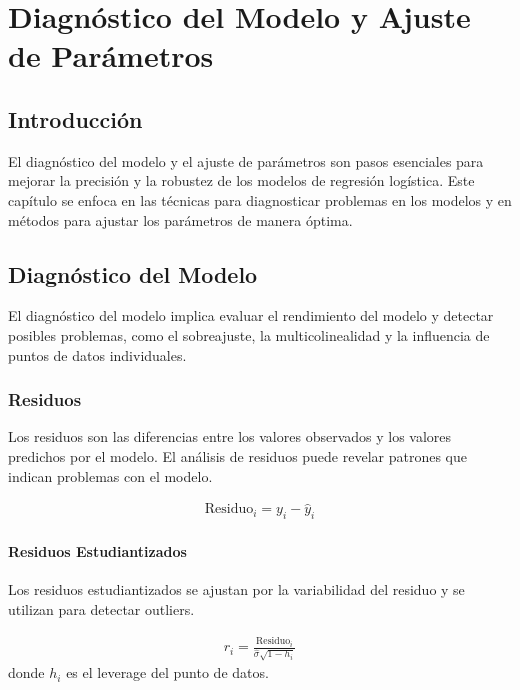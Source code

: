 \documentclass[a4paper]{report} %
\begin{document}
\chapter{Diagn\'ostico del Modelo y Ajuste de Par\'ametros}

\section{Introducci\'on}

El diagn\'ostico del modelo y el ajuste de par\'ametros son pasos esenciales para mejorar la precisi\'on y la robustez de los modelos de regresi\'on log\'istica. Este cap\'itulo se enfoca en las t\'ecnicas para diagnosticar problemas en los modelos y en m\'etodos para ajustar los par\'ametros de manera \'optima.

\section{Diagn\'ostico del Modelo}

El diagn\'ostico del modelo implica evaluar el rendimiento del modelo y detectar posibles problemas, como el sobreajuste, la multicolinealidad y la influencia de puntos de datos individuales.

\subsection{Residuos}

Los residuos son las diferencias entre los valores observados y los valores predichos por el modelo. El an\'alisis de residuos puede revelar patrones que indican problemas con el modelo.

\begin{eqnarray*}
\text{Residuo}_i = y_i - \hat{y}_i
\end{eqnarray*}

\subsubsection{Residuos Estudiantizados}

Los residuos estudiantizados se ajustan por la variabilidad del residuo y se utilizan para detectar outliers.

\begin{eqnarray*}
r_i = \frac{\text{Residuo}_i}{\hat{\sigma} \sqrt{1 - h_i}}
\end{eqnarray*}
donde $h_i$ es el leverage del punto de datos.
\end{document}
